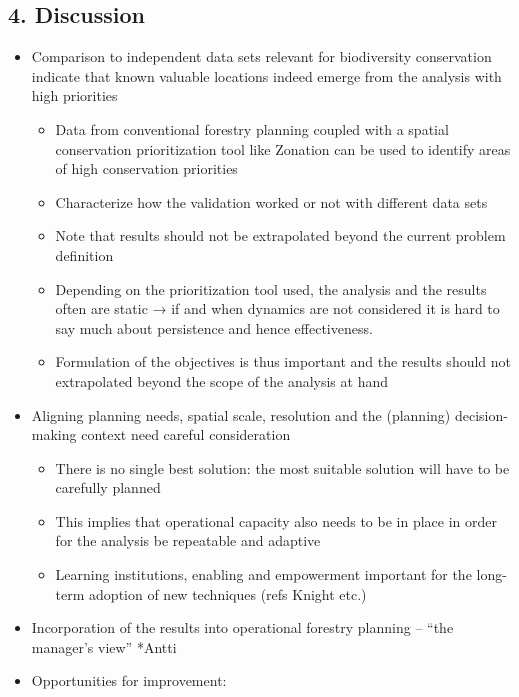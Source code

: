 \documentclass[]{article}
\begin{document}
\subsection{4. Discussion}

\begin{itemize}
\itemsep1pt\parskip0pt
\item
  Comparison to independent data sets relevant for biodiversity
  conservation indicate that known valuable locations indeed emerge from
  the analysis with high priorities

  \begin{itemize}
  \itemsep1pt\parskip0pt
  \item
    Data from conventional forestry planning coupled with a spatial
    conservation prioritization tool like Zonation can be used to
    identify areas of high conservation priorities
  \item
    Characterize how the validation worked or not with different data
    sets
  \item
    Note that results should not be extrapolated beyond the current
    problem definition
  \item
    Depending on the prioritization tool used, the analysis and the
    results often are static → if and when dynamics are not considered
    it is hard to say much about persistence and hence effectiveness.
  \item
    Formulation of the objectives is thus important and the results
    should not extrapolated beyond the scope of the analysis at hand
  \end{itemize}
\item
  Aligning planning needs, spatial scale, resolution and the (planning)
  decision-making context need careful consideration

  \begin{itemize}
  \itemsep1pt\parskip0pt
  \item
    There is no single best solution: the most suitable solution will
    have to be carefully planned
  \item
    This implies that operational capacity also needs to be in place in
    order for the analysis be repeatable and adaptive
  \item
    Learning institutions, enabling and empowerment important for the
    long-term adoption of new techniques (refs Knight etc.)
  \end{itemize}
\item
  Incorporation of the results into operational forestry planning --
  ``the manager's view'' *Antti
\item
  Opportunities for improvement:


\end{itemize}
\end{document}
